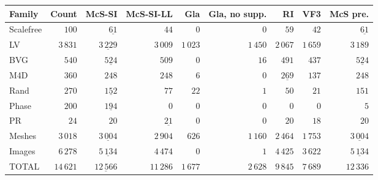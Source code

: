 
\begin{tabular}{lrrrrrrrr}
    \toprule
    Family & Count & McS-SI & McS-SI-LL & Gla & Gla, no supp. & RI & VF3 & McS pre.\\
    \midrule

\rule{0pt}{2.3ex}Scalefree & $100$ & $\underline{61}$ & $44$ & $0$ & $0$ & $59$ & $42$ & $\underline{61}$\\
\rule{0pt}{2.3ex}LV & $3\,831$ & $\underline{3\,229}$ & $3\,009$ & $1\,023$ & $1\,450$ & $2\,067$ & $1\,659$ & $3\,189$\\
\rule{0pt}{2.3ex}BVG & $540$ & $\underline{524}$ & $509$ & $0$ & $16$ & $491$ & $437$ & $\underline{524}$\\
\rule{0pt}{2.3ex}M4D & $360$ & $248$ & $248$ & $6$ & $0$ & $\underline{269}$ & $137$ & $248$\\
\rule{0pt}{2.3ex}Rand & $270$ & $\underline{152}$ & $77$ & $22$ & $1$ & $50$ & $21$ & $151$\\
\rule{0pt}{2.3ex}Phase & $200$ & $\underline{194}$ & $0$ & $0$ & $0$ & $0$ & $0$ & $5$\\
\rule{0pt}{2.3ex}PR & $24$ & $20$ & $\underline{21}$ & $0$ & $0$ & $20$ & $18$ & $20$\\
\rule{0pt}{2.3ex}Meshes & $3\,018$ & $\underline{3\,004}$ & $2\,904$ & $626$ & $1\,160$ & $2\,464$ & $1\,753$ & $\underline{3\,004}$\\
\rule{0pt}{2.3ex}Images & $6\,278$ & $\underline{5\,134}$ & $4\,474$ & $0$ & $1$ & $4\,425$ & $3\,622$ & $\underline{5\,134}$\\
\midrule
\rule{0pt}{2.3ex}TOTAL & $14\,621$ & $\underline{12\,566}$ & $11\,286$ & $1\,677$ & $2\,628$ & $9\,845$ & $7\,689$ & $12\,336$\\

    \bottomrule
\end{tabular}


